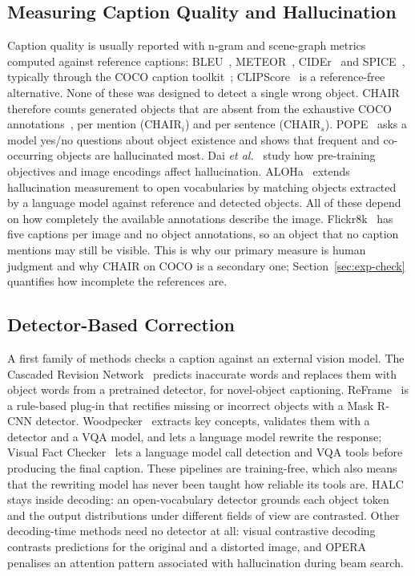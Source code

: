 \subsection{Measuring Caption Quality and Hallucination}
Caption quality is usually reported with n-gram and scene-graph metrics computed against reference captions: BLEU~\cite{papineni2002bleu}, METEOR~\cite{banerjee2005meteor}, CIDEr~\cite{vedantam2015cider} and SPICE~\cite{anderson2016spice}, typically through the COCO caption toolkit~\cite{chen2015microsoft}; CLIPScore~\cite{hessel2021clipscore} is a reference-free alternative. None of these was designed to detect a single wrong object. CHAIR~\cite{rohrbach2018object} therefore counts generated objects that are absent from the exhaustive COCO annotations~\cite{lin2014microsoft}, per mention (CHAIR$_i$) and per sentence (CHAIR$_s$). POPE~\cite{li2023evaluating} asks a model yes/no questions about object existence and shows that frequent and co-occurring objects are hallucinated most. Dai \emph{et al.}~\cite{dai2023plausible} study how pre-training objectives and image encodings affect hallucination. ALOHa~\cite{petryk2024aloha} extends hallucination measurement to open vocabularies by matching objects extracted by a language model against reference and detected objects. All of these depend on how completely the available annotations describe the image. Flickr8k~\cite{hodosh2013framing} has five captions per image and no object annotations, so an object that no caption mentions may still be visible. This is why our primary measure is human judgment and why CHAIR on COCO is a secondary one; Section~\ref{sec:exp-check} quantifies how incomplete the references are.

\subsection{Detector-Based Correction}
A first family of methods checks a caption against an external vision model. The Cascaded Revision Network~\cite{feng2020cascaded} predicts inaccurate words and replaces them with object words from a pretrained detector, for novel-object captioning. ReFrame~\cite{adhikary2024reframe} is a rule-based plug-in that rectifies missing or incorrect objects with a Mask R-CNN detector. Woodpecker~\cite{yin2024woodpecker} extracts key concepts, validates them with a detector and a VQA model, and lets a language model rewrite the response; Visual Fact Checker~\cite{ge2024visual} lets a language model call detection and VQA tools before producing the final caption. These pipelines are training-free, which also means that the rewriting model has never been taught how reliable its tools are. HALC~\cite{chen2024halc} stays inside decoding: an open-vocabulary detector grounds each object token and the output distributions under different fields of view are contrasted. Other decoding-time methods need no detector at all: visual contrastive decoding~\cite{leng2024mitigating} contrasts predictions for the original and a distorted image, and OPERA~\cite{huang2024opera} penalises an attention pattern associated with hallucination during beam search.

